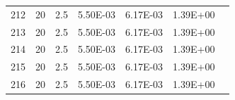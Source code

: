 \documentclass{article}
\begin{document}
\begin{landscape}
\begin{table}[]
\begin{tabular}{lllllll}
212    & 20                  & 2.5                                       & 5.50E-03             & 6.17E-03             & 1.39E+00                                                                &  \\
213    & 20                  & 2.5                                       & 5.50E-03             & 6.17E-03             & 1.39E+00                                                                &  \\
214    & 20                  & 2.5                                       & 5.50E-03             & 6.17E-03             & 1.39E+00                                                                &  \\
215    & 20                  & 2.5                                       & 5.50E-03             & 6.17E-03             & 1.39E+00                                                                &  \\
216    & 20                  & 2.5                                       & 5.50E-03             & 6.17E-03             & 1.39E+00                                                                & 
\end{tabular}
\end{table}
\end{landscape}
\end{document}
